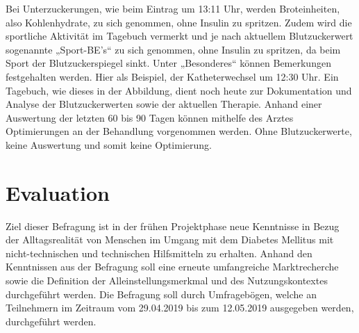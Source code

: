 \documentclass[a4paper,11pt]{article}%
\renewcommand{\\}{\vspace*{0.5\baselineskip} \newline}
\begin{document}
		Bei Unterzuckerungen, wie beim Eintrag um 13:11 Uhr, werden Broteinheiten, also Kohlenhydrate, zu sich genommen, ohne Insulin zu spritzen.\newline
		Zudem wird die sportliche Aktivität im Tagebuch vermerkt und je nach aktuellem Blutzuckerwert sogenannte „Sport-BE’s“ zu sich genommen, ohne Insulin zu spritzen, da beim Sport der Blutzuckerspiegel sinkt.\newline
		Unter „Besonderes“ können Bemerkungen festgehalten werden. Hier als Beispiel, der Katheterwechsel um 12:30 Uhr.\newline
		Ein Tagebuch, wie dieses in der Abbildung, dient noch heute zur Dokumentation und Analyse der Blutzuckerwerten sowie der aktuellen Therapie. Anhand einer Auswertung der letzten 60 bis 90 Tagen können mithelfe des Arztes Optimierungen an der Behandlung vorgenommen werden. Ohne Blutzuckerwerte, keine Auswertung und somit keine Optimierung.
\newpage
\section{Evaluation}
\label{section:Evaluation}
	Ziel dieser Befragung ist in der frühen Projektphase neue Kenntnisse in Bezug der Alltagsrealität von Menschen im Umgang mit dem Diabetes Mellitus mit nicht-technischen und technischen Hilfsmitteln zu erhalten.\newline
	Anhand den Kenntnissen aus der Befragung soll eine erneute umfangreiche Marktrecherche sowie die Definition der Alleinstellungsmerkmal und des Nutzungskontextes durchgeführt werden. Die Befragung soll durch Umfragebögen, welche an Teilnehmern im Zeitraum vom 29.04.2019 bis zum 12.05.2019 ausgegeben werden, durchgeführt werden. 
\end{document}
